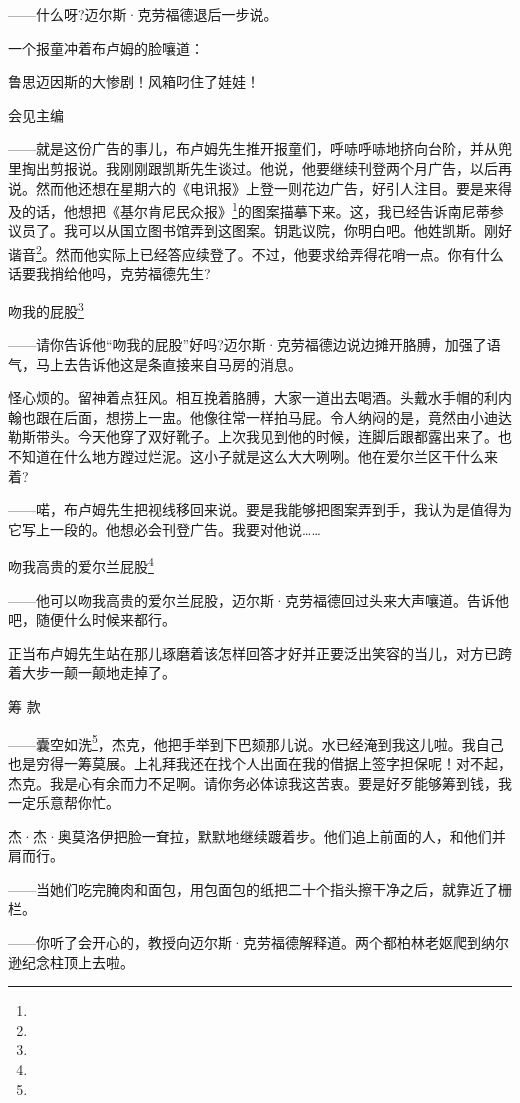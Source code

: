 \par ——什么呀?迈尔斯·克劳福德退后一步说。
\par 一个报童冲着布卢姆的脸嚷道：
\par 鲁思迈因斯的大惨剧！风箱叼住了娃娃！
\par 会见主编
\par ——就是这份广告的事儿，布卢姆先生推开报童们，呼哧呼哧地挤向台阶，并从兜里掏出剪报说。我刚刚跟凯斯先生谈过。他说，他要继续刊登两个月广告，以后再说。然而他还想在星期六的《电讯报》上登一则花边广告，好引人注目。要是来得及的话，他想把《基尔肯尼民众报》\footnote{}的图案描摹下来。这，我已经告诉南尼蒂参议员了。我可以从国立图书馆弄到这图案。钥匙议院，你明白吧。他姓凯斯。刚好谐音\footnote{}。然而他实际上已经答应续登了。不过，他要求给弄得花哨一点。你有什么话要我捎给他吗，克劳福德先生?
\par 吻我的屁股\footnote{}
\par ——请你告诉他“吻我的屁股”好吗?迈尔斯·克劳福德边说边摊开胳膊，加强了语气，马上去告诉他这是条直接来自马房的消息。
\par 怪心烦的。留神着点狂风。相互挽着胳膊，大家一道出去喝酒。头戴水手帽的利内翰也跟在后面，想捞上一盅。他像往常一样拍马屁。令人纳闷的是，竟然由小迪达勒斯带头。今天他穿了双好靴子。上次我见到他的时候，连脚后跟都露出来了。也不知道在什么地方蹚过烂泥。这小子就是这么大大咧咧。他在爱尔兰区干什么来着?
\par ——喏，布卢姆先生把视线移回来说。要是我能够把图案弄到手，我认为是值得为它写上一段的。他想必会刊登广告。我要对他说……
\par 吻我高贵的爱尔兰屁股\footnote{}
\par ——他可以吻我高贵的爱尔兰屁股，迈尔斯·克劳福德回过头来大声嚷道。告诉他吧，随便什么时候来都行。
\par 正当布卢姆先生站在那儿琢磨着该怎样回答才好并正要泛出笑容的当儿，对方已跨着大步一颠一颠地走掉了。
\par 筹 款
\par ——囊空如洗\footnote{}，杰克，他把手举到下巴颏那儿说。水已经淹到我这儿啦。我自己也是穷得一筹莫展。上礼拜我还在找个人出面在我的借据上签字担保呢！对不起，杰克。我是心有余而力不足啊。请你务必体谅我这苦衷。要是好歹能够筹到钱，我一定乐意帮你忙。
\par 杰·杰·奥莫洛伊把脸一耷拉，默默地继续踱着步。他们追上前面的人，和他们并肩而行。
\par ——当她们吃完腌肉和面包，用包面包的纸把二十个指头擦干净之后，就靠近了栅栏。
\par ——你听了会开心的，教授向迈尔斯·克劳福德解释道。两个都柏林老妪爬到纳尔逊纪念柱顶上去啦。
